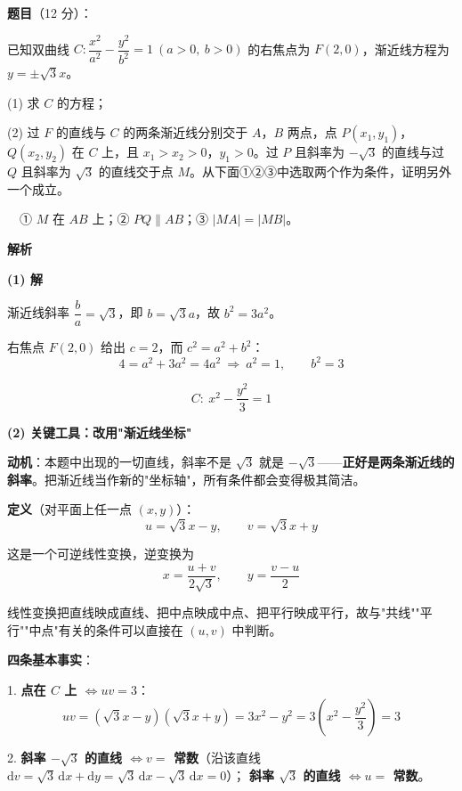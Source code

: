 \begin{answer}

\textbf{题目}（12 分）：

已知双曲线 $C:\dfrac{x^{2}}{a^{2}}-\dfrac{y^{2}}{b^{2}}=1\ (a>0,\ b>0)$ 的右焦点为 $F(2,0)$，渐近线方程为 $y=\pm\sqrt3x$。

  (1) 求 $C$ 的方程；

  (2) 过 $F$ 的直线与 $C$ 的两条渐近线分别交于 $A$，$B$ 两点，点 $P\left(x_1,y_1\right)$，$Q\left(x_2,y_2\right)$ 在 $C$ 上，且 $x_1>x_2>0$，$y_1>0$。过 $P$ 且斜率为 $-\sqrt3$ 的直线与过 $Q$ 且斜率为 $\sqrt3$ 的直线交于点 $M$。从下面①②③中选取两个作为条件，证明另外一个成立。

  　① $M$ 在 $AB$ 上；② $PQ\parallel AB$；③ $|MA|=|MB|$。

\textbf{解析}

\par\medskip

\textbf{(1) 解}

渐近线斜率 $\dfrac ba=\sqrt3$，即 $b=\sqrt3a$，故 $b^{2}=3a^{2}$。

右焦点 $F(2,0)$ 给出 $c=2$，而 $c^{2}=a^{2}+b^{2}$：
\nopagebreak[4]
\[4=a^{2}+3a^{2}=4a^{2}\ \Longrightarrow\ a^{2}=1,\qquad b^{2}=3\]

\nopagebreak[4]
\[C:\ x^{2}-\frac{y^{2}}3=1\]

\par\medskip

\textbf{(2) 关键工具：改用"渐近线坐标"}

\textbf{动机}：本题中出现的一切直线，斜率不是 $\sqrt3$ 就是 $-\sqrt3$——\textbf{正好是两条渐近线的斜率}。把渐近线当作新的"坐标轴"，所有条件都会变得极其简洁。

\textbf{定义}（对平面上任一点 $(x,y)$）：
\nopagebreak[4]
\[u=\sqrt3x-y,\qquad v=\sqrt3x+y\]

这是一个可逆线性变换，逆变换为
\nopagebreak[4]
\[x=\frac{u+v}{2\sqrt3},\qquad y=\frac{v-u}2\]

线性变换把直线映成直线、把中点映成中点、把平行映成平行，故与"共线""平行""中点"有关的条件可以直接在 $(u,v)$ 中判断。

\textbf{四条基本事实}：

1. \textbf{点在 $C$ 上 $\iff uv=3$}：
\nopagebreak[4]
\[uv=\left(\sqrt3x-y\right)\left(\sqrt3x+y\right)=3x^{2}-y^{2}=3\left(x^{2}-\frac{y^{2}}3\right)=3\]

2. \textbf{斜率 $-\sqrt3$ 的直线 $\iff v=$ 常数}（沿该直线 $\mathrm dv=\sqrt3\,\mathrm dx+\mathrm dy=\sqrt3\,\mathrm dx-\sqrt3\,\mathrm dx=0$）；
   \textbf{斜率 $\sqrt3$ 的直线 $\iff u=$ 常数}。


\end{answer}
